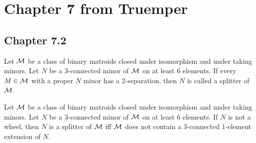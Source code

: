 \section{Chapter 7 from Truemper}

\subsection{Chapter 7.2}

\begin{definition}[splitter]
  \label{def:splitter}
  Let $\mathcal{M}$ be a class of binary matroids closed under isomorphism and under taking minors. Let $N$ be a $3$-connected minor of $\mathcal{M}$ on at least $6$ elements.
  If every $M \in \mathcal{M}$ with a proper $N$ minor has a $2$-separation, then $N$ is called a splitter of $\mathcal{M}$.
\end{definition}

\begin{theorem}
  \label{thm:7.2.1.a}
  Let $\mathcal{M}$ be a class of binary matroids closed under isomorphism and under taking minors. Let $N$ be a $3$-connected minor of $\mathcal{M}$ on at least $6$ elements.
  If $N$ is not a wheel, then $N$ is a splitter of $\mathcal{M}$ iff $\mathcal{M}$ does not contain a $3$-connected $1$-element extension of $N$.
\end{theorem}

